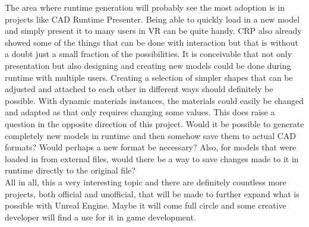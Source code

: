 The area where runtime generation will probably see the most adoption is in projects like CAD Runtime Presenter. Being able to quickly load in a new model and simply present it to many users in VR can be quite handy. \acs{CRP} also already showed some of the things that can be done with interaction but that is without a doubt just a small fraction of the possibilities. It is conceivable that not only presentation but also designing and creating new models could be done during runtime with multiple users. Creating a selection of simpler shapes that can be adjusted and attached to each other in different ways should definitely be possible. With dynamic materials instances, the materials could easily be changed and adapted as that only requires changing some values. This does raise a question in the opposite direction of this project. Would it be possible to generate completely new models in runtime and then somehow save them to actual CAD formats? Would perhaps a new format be necessary? Also, for models that were loaded in from external files, would there be a way to save changes made to it in runtime directly to the original file?\\
All in all, this a very interesting topic and there are definitely countless more projects, both official and unofficial, that will be made to further expand what is possible with Unreal Engine. Maybe it will come full circle and some creative developer will find a use for it in game development.

